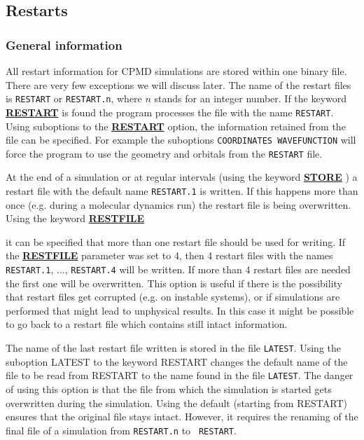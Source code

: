 \documentclass[twoside,10pt,titlepage,a4paper]{article}
\newcommand{\referto}[2]{\hyperlink{#1}{#2}}
\newcommand{\referto}[2]{\htmlref{#2}{#1}}
\newcommand{\refkeyword}[1]{%
\referto{#1}{\textbf{#1}}%
\index{#1}%
}%
\begin{document}
\subsection{Restarts}

\subsubsection{General information}

  All restart information for CPMD simulations are stored within one binary
file. There are very few exceptions we will discuss later. The name of the
restart files is \texttt{RESTART} or \texttt{RESTART.n}, where $n$ stands for an
integer number. If the keyword \refkeyword{RESTART} is found the program
processes the file with the name \texttt{RESTART}. Using suboptions to the
\refkeyword{RESTART} option, the information retained from the file can be
specified. For example the suboptions \texttt{COORDINATES WAVEFUNCTION} will
force the program to use the geometry and orbitals from the \texttt{RESTART}
file.

  At the end of a simulation or at regular intervals (using the keyword
\refkeyword{STORE}) a restart file with the default name \texttt{RESTART.1} is
written. If this happens more than once (e.g. during a molecular dynamics run)
the restart file is being overwritten. Using the keyword \refkeyword{RESTFILE}
it can be specified that more than one restart file should be used for writing.
If the \refkeyword{RESTFILE} parameter was set to 4, then 4 restart files with
the names \texttt{RESTART.1}, $\ldots$, \texttt{RESTART.4} will be written. If
more than 4 restart files are needed the first one will be overwritten. This
option is useful if there is the possibility that restart files get corrupted
(e.g. on instable systems), or if simulations are performed that might lead to
unphysical results. In this case it might be possible to go back to a restart
file which contains still intact information.

  The name of the last restart file written is stored in the file {\tt LATEST}.
Using the suboption LATEST to the keyword RESTART changes the default name of
the file to be read from RESTART to the name found in the file {\tt LATEST}.
The danger of using this option is that the file from which the simulation is
started gets overwritten during the simulation. Using the default (starting
from RESTART) ensures that the original file stays intact. However, it requires
the renaming of the final file of a simulation from \texttt{RESTART.n} to {\tt
RESTART}.
\end{document}
